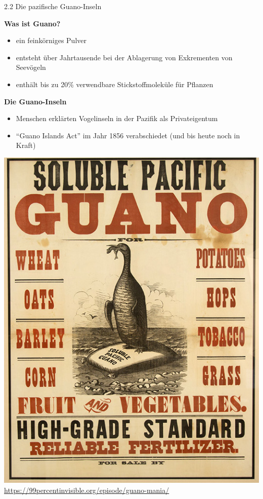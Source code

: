 \documentclass[
    aspectratio=1610
    ]{beamer}
\begin{document}
    \begin{frame}{2.2 Die pazifische Guano-Inseln}    
        \begin{minipage}{9.5cm}
            \textbf{Was ist Guano?}
            \begin{itemize}
                \item ein feinkörniges Pulver
                \item entsteht über Jahrtausende bei der Ablagerung von Exkrementen von Seevögeln
                \item enthält bis zu 20\% verwendbare Stickstoffmoleküle für Pflanzen
            \end{itemize}
            \textbf{Die Guano-Inseln}
            \begin{itemize}
                \item Menschen erklärten Vogelinseln in der Pazifik als Privateigentum
                \item ``Guano Islands Act'' im Jahr 1856 verabschiedet (und bis heute noch in Kraft)
            \end{itemize}
        \end{minipage}
        \hspace{.25cm}
        \begin{minipage}{3.5cm}
            \includegraphics[scale=.3]{figures/GuanoMania.jpg}
            \tiny\color{gray}\url{https://99percentinvisible.org/episode/guano-mania/}
        \end{minipage}
    \end{frame}
\end{document}
